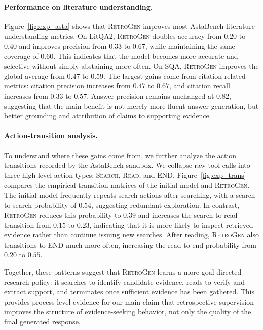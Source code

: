 \paragraph{Performance on literature understanding.}
Figure~\ref{fig:exp_asta} shows that \textsc{RetroGen} improves most
AstaBench literature-understanding metrics. On LitQA2, \textsc{RetroGen}
doubles accuracy from $0.20$ to $0.40$ and improves precision from $0.33$ to
$0.67$, while maintaining the same coverage of $0.60$. This indicates that the
model becomes more accurate and selective without simply abstaining more often.
On SQA, \textsc{RetroGen} improves the global average from $0.47$ to $0.59$.
The largest gains come from citation-related metrics: citation precision
increases from $0.47$ to $0.67$, and citation recall increases from $0.33$ to
$0.57$. Answer precision remains unchanged at $0.82$, suggesting that the main
benefit is not merely more fluent answer generation, but better grounding and
attribution of claims to supporting evidence.

\paragraph{Action-transition analysis.}
To understand where these gains come from, we further analyze the action
transitions recorded by the AstaBench sandbox. We collapse raw tool calls into
three high-level action types: \textsc{Search}, \textsc{Read}, and \textsc{END}.
Figure~\ref{fig:exp_trans} compares the empirical transition matrices of the
initial model and \textsc{RetroGen}. The initial model frequently repeats search
actions after searching, with a search-to-search probability of $0.54$,
suggesting redundant exploration. In contrast, \textsc{RetroGen} reduces this
probability to $0.39$ and increases the search-to-read transition from $0.15$
to $0.23$, indicating that it is more likely to inspect retrieved evidence
rather than continue issuing new searches. After reading, \textsc{RetroGen}
also transitions to \textsc{END} much more often, increasing the read-to-end
probability from $0.20$ to $0.55$.

Together, these patterns suggest that \textsc{RetroGen} learns a more
goal-directed research policy: it searches to identify candidate evidence,
reads to verify and extract support, and terminates once sufficient evidence has
been gathered. This provides process-level evidence for our main claim that
retrospective supervision improves the structure of evidence-seeking behavior,
not only the quality of the final generated response.

